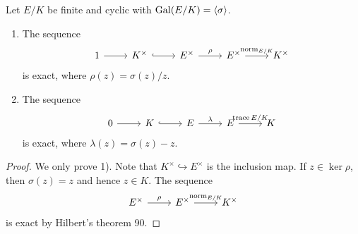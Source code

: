 \begin{corollary}
Let $E/K$ be finite and cyclic with $\operatorname{Gal}(E/K)=\langle\sigma\rangle$. 
\begin{enumerate}
    \item The sequence 
    \[\begin{tikzcd}
	1 & {K^{\times}} & {E^{\times}} & {E^{\times}} & {K^{\times}}
	\arrow[from=1-1, to=1-2]
	\arrow[hook, from=1-2, to=1-3]
	\arrow["\rho", from=1-3, to=1-4]
	\arrow["{\norm_{E/K}}", from=1-4, to=1-5]
    \end{tikzcd}\]
    is exact, where $\rho(z)=\sigma(z)/z$. 
     \item The sequence 
    \[\begin{tikzcd}
	0 & {K} & {E} & {E} & {K}
	\arrow[from=1-1, to=1-2]
	\arrow[hook, from=1-2, to=1-3]
	\arrow["\lambda", from=1-3, to=1-4]
	\arrow["{\trace{E/K}}", from=1-4, to=1-5]
    \end{tikzcd}\]
    is exact, where $\lambda(z)=\sigma(z)-z$. 
\end{enumerate}
\end{corollary}

\begin{proof}
    We only prove 1). Note that 
    $K^{\times}\hookrightarrow E^{\times}$ is the inclusion map. If 
    $z\in\ker\rho$, then $\sigma(z)=z$ and hence $z\in K$. The 
    sequence 
    \[\begin{tikzcd}
	{E^{\times}} & {E^{\times}} & {K^{\times}}
	\arrow["\rho", from=1-1, to=1-2]
	\arrow["{\norm_{E/K}}", from=1-2, to=1-3]
    \end{tikzcd}\]
    is exact by Hilbert's theorem 90. 
\end{proof}

